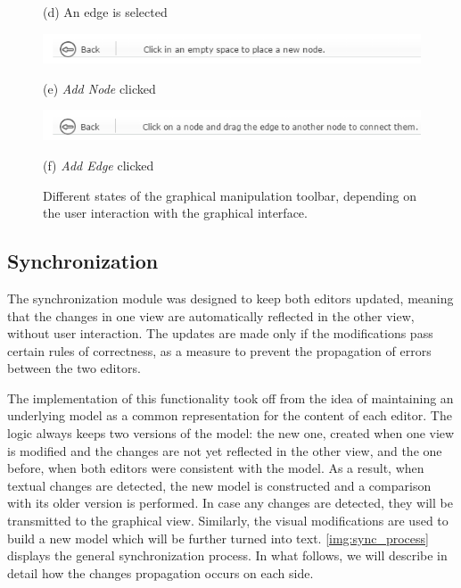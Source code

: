 \begin{figure}[htb]
\begin{minipage}[b]{\linewidth}
  \centerline{(d) An edge is selected}\medskip
\end{minipage}
\begin{minipage}[b]{\linewidth}
  \centering
  \centerline{\includegraphics[width=13cm]{img/edit_add_node.png}}
  \centerline{(e) \textit{Add Node} clicked}\medskip
\end{minipage}
\hfill
\begin{minipage}[b]{\linewidth}
  \centering
  \centerline{\includegraphics[width=13cm]{img/edit_add_edge.png}}
  \centerline{(f) \textit{Add Edge} clicked}\medskip
\end{minipage}
%
\caption{Different states of the graphical manipulation toolbar, depending on the user interaction with the graphical interface.}
\label{img:toolbar}
%
\end{figure}


\subsection {Synchronization}
\label {subsec:synchronization}

The synchronization module was designed to keep both editors updated, meaning that the changes in one view are automatically reflected in the other view, without user interaction. The updates are made only if the modifications pass certain rules of correctness, as a measure to prevent the propagation of errors between the two editors.

The implementation of this functionality took off from the idea of maintaining an underlying model as a common representation for the content of each editor. The logic always keeps two versions of the model: the new one, created when one view is modified and the changes are not yet reflected in the other view, and the one before, when both editors were consistent with the model. As a result, when textual changes are detected, the new model is constructed and a comparison with its older version is performed. In case any changes are detected, they will be transmitted to the graphical view. Similarly, the visual modifications are used to build a new model which will be further turned into text. \autoref{img:sync_process} displays the general synchronization process. In what follows, we will describe in detail how the changes propagation occurs on each side.


